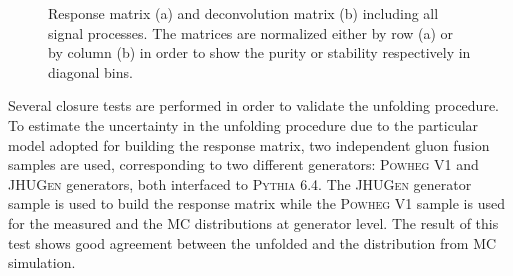 \begin{figure}[!h]
\centering
{}
\caption{Response matrix (a) and deconvolution matrix (b) including all signal processes. The matrices are normalized either by row (a) or by column (b) in order to show the purity or stability respectively in diagonal bins.}\label{fig:matrix}
\end{figure}

Several closure tests are performed in order to validate the unfolding
procedure. To estimate the uncertainty in the unfolding procedure due to the
particular model adopted for building the response matrix, two independent
gluon fusion samples are used, corresponding to two different generators:
\textsc{Powheg V1} and \textsc{JHUGen} generators, both interfaced to \textsc{Pythia 6.4}.
The \textsc{JHUGen} generator sample is used to build the response matrix while the
\textsc{Powheg V1} sample is used for the measured and the MC distributions at
generator level. The result of this test shows good agreement between the unfolded and the distribution from MC simulation.




























